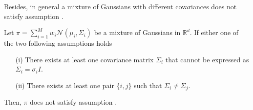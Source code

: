 Besides, in general a mixture of Gaussians with different covariances does not satisfy assumption . 
\begin{lemma}\label{lemma:d_mixture_gaussians_not_expressed_as_convoltuion_with_compactly_supported}
Let $\pi = \sum_{i=1}^M w_i\mathcal{N}(\mu_i, \Sigma_i)$ be a mixture of Gaussians in $\mathbb{R}^d$. If either one of the two following assumptions holds
\begin{enumerate}
    \item[(i)] There exists at least one covariance matrix $\Sigma_i$ that cannot be expressed as  $\Sigma_i= \sigma_i I$.
    \item[(ii)] There exists at least one pair $\{i, j\}$ such that $\Sigma_i\neq \Sigma_j$.
\end{enumerate}
Then, $\pi$ does not satisfy assumption .
\end{lemma}
